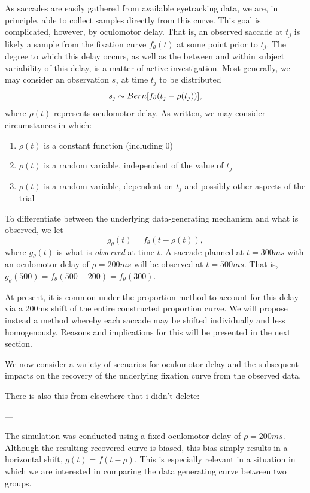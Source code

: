 \documentclass{article}
\begin{document}
As saccades are easily gathered from available eyetracking data, we are, in principle, able to collect samples directly from this curve. This goal is complicated, however, by oculomotor delay. That is, an observed saccade at $t_j$ is likely a sample from the fixation curve $f_{\theta}(t)$ at some point prior to $t_j$. The degree to which this delay occurs, as well as the between and within subject variability of this delay, is a matter of active investigation. Most generally, we may consider an observation $s_j$ at time $t_j$ to be distributed
$$
s_j \sim  Bern \large[f_{\theta}(t_j - \rho(t_j)) \large],
$$ 
where $\rho(t)$ represents oculomotor delay. As written, we may consider circumstances in which:

\begin{enumerate}
\item $\rho(t)$ is a constant function (including 0)
\item $\rho(t)$ is a random variable, independent of the value of $t_j$
\item $\rho(t)$ is a random variable, dependent on $t_j$ and possibly other aspects of the trial
\end{enumerate}

To differentiate between the underlying data-generating mechanism and what is observed, we let
$$
g_{\theta}(t) = f_{\theta}(t - \rho(t)), 
$$
where $g_{\theta}(t)$ is what is \textit{observed} at time $t$. A saccade planned at $t = 300ms$ with an oculomotor delay of $\rho = 200ms$ will be observed at $t = 500ms$. That is, $g_{\theta}(500) = f_{\theta}(500 - 200) = f_{\theta}(300)$.

At present, it is common under the proportion method to account for this delay via a 200ms shift of the entire constructed proportion curve. We will propose instead a method whereby each saccade may be shifted individually and less homogenously. Reasons and implications for this will be presented in the next section.

We now consider a variety of scenarios for oculomotor delay and the subsequent impacts on the recovery of the underlying fixation curve from the observed data.

There is also this from elsewhere that i didn't delete:

---

The simulation was conducted using a fixed oculomotor delay of $\rho = 200ms$. Although the resulting recovered curve is biased, this bias simply results in a horizontal shift, $g(t) = f(t - \rho)$. This is especially relevant in a situation in which we are interested in comparing the data generating curve between two groups. 
\end{document}
